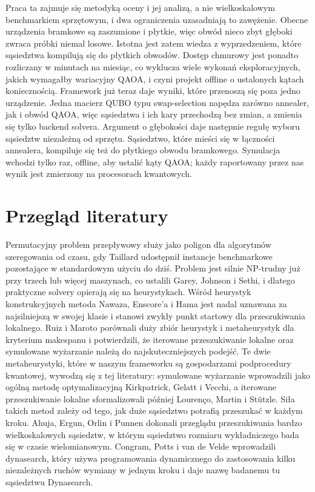 \documentclass[11pt,a4paper]{article}
\begin{document}
Praca ta zajmuje się metodyką oceny i jej analizą, a nie wielkoskalowym
benchmarkiem sprzętowym, i dwa ograniczenia uzasadniają to zawężenie. Obecne
urządzenia bramkowe są zaszumione i płytkie, więc obwód nieco zbyt głęboki
zwraca próbki niemal losowe. Istotna jest zatem wiedza z wyprzedzeniem, które
sąsiedztwa kompilują się do płytkich obwodów. Dostęp chmurowy jest ponadto
rozliczany w minutach na miesiąc, co wyklucza wiele wykonań eksploracyjnych,
jakich wymagałby wariacyjny QAOA, i czyni projekt offline o ustalonych kątach
koniecznością. Framework już teraz daje wyniki, które przenoszą się poza jedno
urządzenie. Jedna macierz QUBO typu swap-selection napędza zarówno annealer,
jak i obwód QAOA, więc sąsiedztwa i ich kary przechodzą bez zmian, a zmienia
się tylko backend solvera. Argument o głębokości daje następnie regułę wyboru
sąsiedztw niezależną od sprzętu. Sąsiedztwo, które mieści się w łączności
annealera, kompiluje się też do płytkiego obwodu bramkowego. Symulacja wchodzi
tylko raz, offline, aby ustalić kąty QAOA; każdy raportowany przez nas wynik
jest zmierzony na procesorach kwantowych.

\section{Przegląd literatury}
\label{sec:related}
Permutacyjny problem przepływowy służy jako poligon dla algorytmów szeregowania
od czasu, gdy Taillard udostępnił instancje benchmarkowe pozostające
w standardowym użyciu do dziś. Problem jest silnie NP-trudny już przy trzech
lub więcej maszynach, co ustalili Garey, Johnson i Sethi, i dlatego praktyczne
solvery opierają się na heurystykach. Wśród heurystyk konstrukcyjnych metoda
Nawaza, Enscore'a i Hama jest nadal uznawana za najsilniejszą w swojej klasie
i stanowi zwykły punkt startowy dla przeszukiwania lokalnego. Ruiz i Maroto
porównali duży zbiór heurystyk i metaheurystyk dla kryterium makespanu
i potwierdzili, że iterowane przeszukiwanie lokalne oraz symulowane wyżarzanie
należą do najskuteczniejszych podejść. Te dwie metaheurystyki, które w naszym
frameworku są gospodarzami podprocedury kwantowej, wywodzą się z tej
literatury: symulowane wyżarzanie wprowadzili jako ogólną metodę
optymalizacyjną Kirkpatrick, Gelatt i Vecchi, a iterowane przeszukiwanie
lokalne sformalizowali później Lourenço, Martin i Stützle. Siła takich metod
zależy od tego, jak duże sąsiedztwo potrafią przeszukać w każdym kroku. Ahuja,
Ergun, Orlin i Punnen dokonali przeglądu przeszukiwania bardzo
wielkoskalowych sąsiedztw, w którym sąsiedztwo rozmiaru wykładniczego bada się
w czasie wielomianowym. Congram, Potts i van de Velde wprowadzili dynasearch,
który używa programowania dynamicznego do zastosowania kilku niezależnych
ruchów wymiany w jednym kroku i daje nazwę badanemu tu sąsiedztwu Dynasearch.
\end{document}

